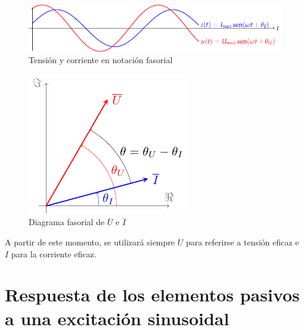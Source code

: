 \begin{figure}[H]
  \centering
  \includegraphics[width=.9\linewidth]{../figs/ondasTensionCorriente.pdf}
  \caption{Tensión y corriente en notación fasorial}
  \label{fig:ondasTensionCorriente}
\end{figure}
	
	
\begin{figure}[H]
  \centering
  \includegraphics[width=0.3\linewidth]{../figs/fasorTensionCorriente.pdf}
  \caption{Diagrama fasorial de $\overline{U}$ e $\overline{I}$}
  \label{fig:fasortensioncorriente}
\end{figure}
	
\begin{remark}
  A partir de este momento, se utilizará siempre $U$ para referirse a
  tensión eficaz e $I$ para la corriente eficaz.
\end{remark}
	
\section{Respuesta de los elementos pasivos a una excitación
  sinusoidal}
	
